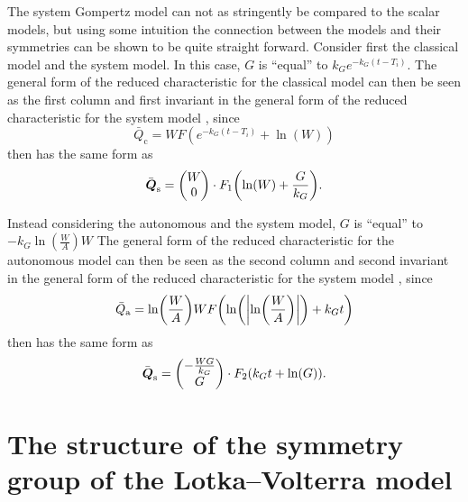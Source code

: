 The system Gompertz model can not as stringently be compared to the scalar models, but using some intuition the connection between the models and their symmetries can be shown to be quite straight forward.
Consider first the classical model and the system model.
In this case, \(G\) is \enquote{equal} to \(k_G e^{-k_G (t - T_i)}\).
The general form of the reduced characteristic for the classical model  can then be seen as the first column and first invariant in the general form of the reduced characteristic for the system model , since
\begin{equation*}
  \bar{Q}_{\text{c}} = W F\left(e^{-k_G (t - T_i)} + \ln\left(W\right)\right)
\end{equation*}
then has the same form as
\begin{equation*}
  \bar{\vect{Q}}_{\text{s}} =
  \begin{pmatrix}
    W \\
    0
  \end{pmatrix}
  \cdot F_1\left(\ln\left(W\right) + \frac{G}{k_G}\right).
\end{equation*}

Instead considering the autonomous and the system model, \(G\) is \enquote{equal} to \(-k_G \ln\left(\frac{W}{A}\right) W\)
The general form of the reduced characteristic for the autonomous model  can then be seen as the second column and second invariant in the general form of the reduced characteristic for the system model , since
\begin{equation*}
  \bar{Q}_{\text{a}} = \ln\left(\frac{W}{A}\right) W F\left(\ln\left(\abs{\ln\left(\frac{W}{A}\right)}\right) + k_G t\right)
\end{equation*}
then has the same form as
\begin{equation*}
  \bar{\vect{Q}}_{\text{s}} =
  \begin{pmatrix}
    - \frac{W G}{k_G} \\
    G
  \end{pmatrix}
  \cdot F_2\left(k_G t + \ln\left(G\right)\right).
\end{equation*}

\section{The structure of the symmetry group of the Lotka--Volterra model}

